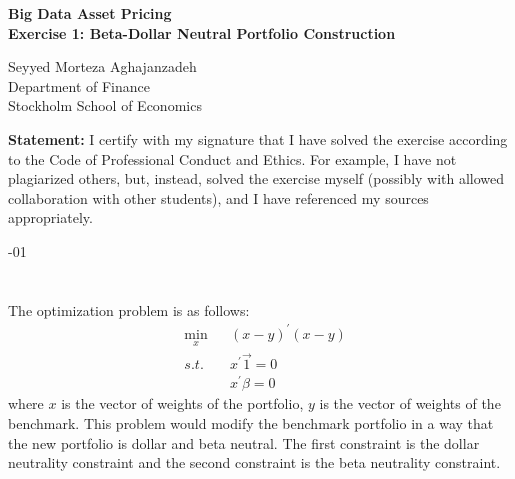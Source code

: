 \documentclass[hidelinks,12pt]{article}
\begin{document}
\begin{titlepage}
    \begin{center}
        \vspace*{1cm}
        
        
        
        \large
        \textbf{Big Data Asset Pricing \\ Exercise 1: Beta-Dollar Neutral Portfolio Construction}
            
        
        \normalsize
        Seyyed Morteza Aghajanzadeh \\
        Department of Finance \\
        Stockholm School of Economics
        
        \vfill
        \normalsize
        \justifying
        \noindent
        \textbf{Statement:} I certify with my signature that I have solved the exercise according to the Code of Professional Conduct and Ethics. 
        For example, I have not plagiarized others, but, instead, solved the exercise myself (possibly with allowed collaboration with other students), and I have referenced my sources appropriately.

        \vfill
        
        \vspace{0.8cm}
            
        
        \vspace{0.8cm}
        \normalsize
        -01
            
    \end{center}
\end{titlepage}
\section{}
The optimization problem is as follows:
\begin{equation*}
    \begin{aligned}
        & \underset{x }{\min}
        & & (x-y)^{'} (x-y) \\
        & s.t. 
        & & x^{'} \overrightarrow{1} = 0  \\
        & & & x^{'} \beta = 0
    \end{aligned}
\end{equation*}
where $x$ is the vector of weights of the portfolio, $y$ is the vector of weights of the benchmark. This problem would modify the benchmark portfolio in a way that the new portfolio is dollar and beta neutral.  The first constraint is the dollar neutrality constraint and the second constraint is the beta neutrality constraint.
\end{document}
